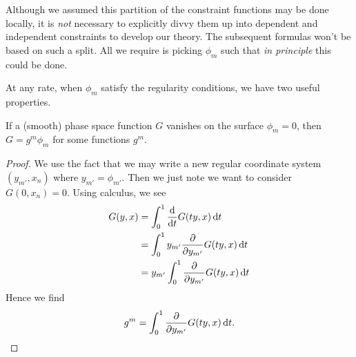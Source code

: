 Although we assumed this partition of the constraint functions may be
done locally, it is \emph{not} necessary to explicitly divvy them up
into dependent and independent constraints to develop our theory. The
subsequent formulas won't be based on such a split. All we require is
picking $\phi_{m}$ such that \emph{in principle} this could be done.

At any rate, when $\phi_{m}$ satisfy the regularity conditions, we have
two useful properties.

\begin{thm}
If a (smooth) phase space function $G$ vanishes on the surface
$\phi_{m}=0$, then $G=g^{m}\phi_{m}$ for some functions $g^{m}$.
\end{thm}

\begin{proof}
We use the fact that we may write a new regular coordinate system
$(y_{m'},x_{n})$ where $y_{m'}=\phi_{m'}$. Then we just note we want to
consider $G(0,x_{n})=0$. Using calculus, we see
\begin{subequations}
\begin{align}
G(y,x) &= \int^{1}_{0}\frac{\mathrm{d}}{\mathrm{d} t}G(ty, x)\,\mathrm{d} t\\    
&=\int^{1}_{0}y_{m'}\frac{\partial}{\partial y_{m'}}G(ty, x)\,\mathrm{d} t\\
&=y_{m'}\int^{1}_{0}\frac{\partial}{\partial y_{m'}}G(ty, x)\,\mathrm{d} t
\end{align}
\end{subequations}
Hence we find
\begin{equation*}
g^{m}=\int^{1}_{0}\frac{\partial}{\partial y_{m'}}G(ty, x)\,\mathrm{d} t.\qedhere
\end{equation*}
\end{proof}

